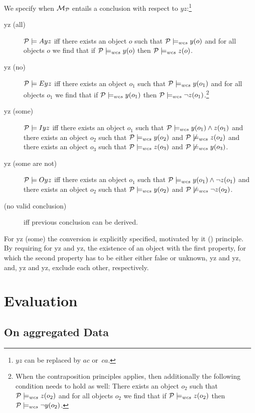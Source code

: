 \documentclass[12pt]{article}
\begin{document}
We specify when ${\cal M}_{\cal P}$ entails a conclusion with respect to $yz$:\footnote{$yz$ can be replaced by $ac$ or~$ca$.}
\begin{description}
\item[\MA yz (all)] ${\cal P} \models Ayz$ iff there exists an object $o$ such that ${\cal P} \models_{wcs}
y(o)$ and for all objects $o$ we find that if ${\cal P} \models_{wcs} y(o)$ then ${\cal P} \models_{wcs} z(o)$.
\item [\ME yz (no)]
${\cal P} \models Eyz$ iff there exists an object $o_1$ such that ${\cal P} \models_{wcs}
y(o_1)$ and for all objects $o_1$ we find that if ${\cal P} \models_{wcs} y(o_1)$ then
${\cal P} \models_{wcs} \neg z(o_1)$.\footnote{
When the contraposition principles applies, then additionally 
the following condition needs to hold as well: There exists an object $o_2$ such that ${\cal P} \models_{wcs}
z(o_2)$ and for all objects $o_2$ we find that if ${\cal P} \models_{wcs} z(o_2)$ then
${\cal P} \models_{wcs} \neg y(o_2)$.}
\item[\MI yz (some)]
${\cal P} \models Iyz$ iff there exists an object $o_1$ such that ${\cal P} \models_{wcs}
y(o_1) \wedge z(o_1)$ and there exists an
object $o_2$ such that ${\cal P} \models_{wcs} y(o_2)$ and
${\cal P} \not\models_{wcs} z(o_2)$ and
there exists an
object $o_3$ such that ${\cal P} \models_{wcs} z(o_3)$ and
${\cal P} \not\models_{wcs} y(o_3)$.
\item[\MO yz (some are not)]
${\cal P} \models Oyz$ iff there exists an object $o_1$ such that ${\cal P} \models_{wcs}
y(o_1) \wedge \neg z(o_1)$ and there exists an
object $o_2$ such that ${\cal P} \models_{wcs} y(o_2)$ and
${\cal P} \not\models_{wcs} \neg z(o_2)$.
\item[\NVC (no valid conclusion)] iff previous conclusion can be derived.
\end{description}
For \MI yz (some) the conversion is explicitly specified, motivated by it (\converse) principle.
By requiring for \MI yz and \MO yz, the existence of an object with the first property,
for which the second property has to be either either false or unknown, \MA yz and \MI yz, and, \ME yz and \MO yz, exclude each other, respectively.

\section{Evaluation} \label{sect:aggregateddata}



\subsection{On aggregated Data}
\end{document}
